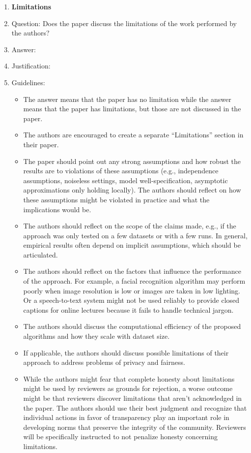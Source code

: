 \documentclass{article}
\begin{document}
\begin{enumerate}
\item {\bf Limitations}
    \item[] Question: Does the paper discuss the limitations of the work performed by the authors?
    \item[] Answer: \answerTODO{} %
    \item[] Justification: \justificationTODO{}
    \item[] Guidelines:
    \begin{itemize}
        \item The answer \answerNA{} means that the paper has no limitation while the answer \answerNo{} means that the paper has limitations, but those are not discussed in the paper. 
        \item The authors are encouraged to create a separate ``Limitations'' section in their paper.
        \item The paper should point out any strong assumptions and how robust the results are to violations of these assumptions (e.g., independence assumptions, noiseless settings, model well-specification, asymptotic approximations only holding locally). The authors should reflect on how these assumptions might be violated in practice and what the implications would be.
        \item The authors should reflect on the scope of the claims made, e.g., if the approach was only tested on a few datasets or with a few runs. In general, empirical results often depend on implicit assumptions, which should be articulated.
        \item The authors should reflect on the factors that influence the performance of the approach. For example, a facial recognition algorithm may perform poorly when image resolution is low or images are taken in low lighting. Or a speech-to-text system might not be used reliably to provide closed captions for online lectures because it fails to handle technical jargon.
        \item The authors should discuss the computational efficiency of the proposed algorithms and how they scale with dataset size.
        \item If applicable, the authors should discuss possible limitations of their approach to address problems of privacy and fairness.
        \item While the authors might fear that complete honesty about limitations might be used by reviewers as grounds for rejection, a worse outcome might be that reviewers discover limitations that aren't acknowledged in the paper. The authors should use their best judgment and recognize that individual actions in favor of transparency play an important role in developing norms that preserve the integrity of the community. Reviewers will be specifically instructed to not penalize honesty concerning limitations.
    \end{itemize}


\end{enumerate}
\end{document}
